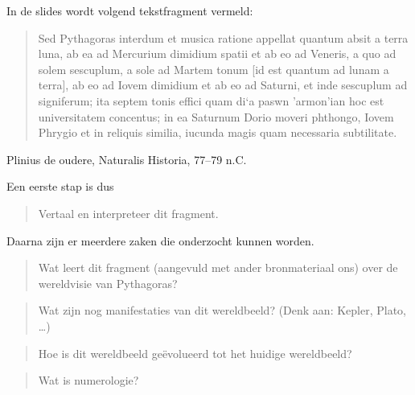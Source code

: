 \documentclass[10pt,a4paper]{article}
\begin{document}
In de slides wordt volgend tekstfragment vermeld:
\begin{quote}
  Sed Pythagoras interdum et musica ratione appellat quantum absit a terra luna, ab ea ad Mercurium dimidium spatii et ab eo ad Veneris, a quo ad solem sescuplum, a sole ad Martem tonum [id est quantum ad lunam a terra], ab eo ad Iovem dimidium et ab eo ad Saturni, et inde sescuplum ad signiferum; ita septem tonis effici quam \greektext di`a paswn 'armon'ian \latintext hoc est universitatem concentus; in ea Saturnum Dorio moveri phthongo, Iovem Phrygio et in reliquis similia, iucunda magis quam necessaria subtilitate.
\end{quote}
\begin{flushright}
  Plinius de oudere, Naturalis Historia, 77--79 n.C.
\end{flushright}
Een eerste stap is dus
\begin{quote}
  Vertaal en interpreteer dit fragment.
\end{quote}
Daarna zijn er meerdere zaken die onderzocht kunnen worden.
\begin{quote}
  Wat leert dit fragment (aangevuld met ander bronmateriaal ons) over de wereldvisie van Pythagoras?
\end{quote}
\begin{quote}
  Wat zijn nog manifestaties van dit wereldbeeld? (Denk aan: Kepler, Plato, \dots)
\end{quote}
\begin{quote}
  Hoe is dit wereldbeeld ge\"evolueerd tot het huidige wereldbeeld?
\end{quote}
\begin{quote}
  Wat is numerologie?
\end{quote}
\end{document}
